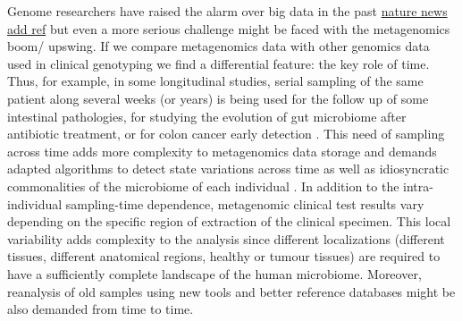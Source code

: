 \documentclass{frontiersSCNS} %
\begin{document}
Genome researchers have raised the alarm over big data in the past
\href{http://www.nature.com/news/genome-researchers-raise-alarm-over-big-data-1.17912}{nature
news add ref} but even a more serious challenge might be faced with the
metagenomics boom/ upswing. If we compare metagenomics data with other
genomics data used in clinical genotyping we find a differential
feature: the key role of time. Thus, for example, in some longitudinal
studies, serial sampling of the same patient along several weeks (or
years) is being used for the follow up of some intestinal pathologies,
for studying the evolution of gut microbiome after antibiotic treatment,
or for colon cancer early detection \citep{zeller2014potential}. This
need of sampling across time adds more complexity to metagenomics data
storage and demands adapted algorithms to detect state variations across
time as well as idiosyncratic commonalities of the microbiome of each
individual \citep{franzosa2015identifying}. In addition to the
intra-individual sampling-time dependence, metagenomic clinical test
results vary depending on the specific region of extraction of the
clinical specimen. This local variability adds complexity to the
analysis since different localizations (different tissues, different
anatomical regions, healthy or tumour tissues) are required to have a
sufficiently complete landscape of the human microbiome. Moreover,
reanalysis of old samples using new tools and better reference databases
might be also demanded from time to time.
\end{document}
